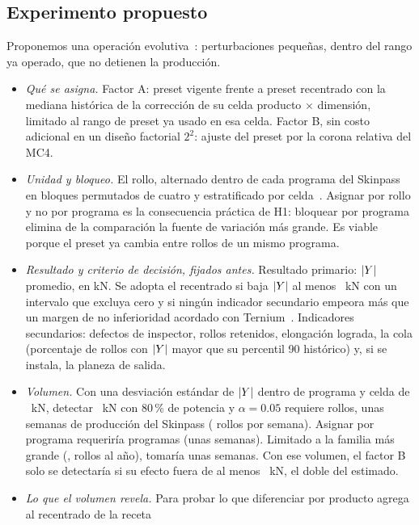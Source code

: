 \subsection{Experimento propuesto}
\label{sec:experimento}
Proponemos una operación evolutiva~\cite{box1957}: perturbaciones pequeñas, dentro del rango ya operado, que no
detienen la producción.
\begin{itemize}
\item \emph{Qué se asigna.} Factor A: preset vigente frente a preset recentrado con la mediana histórica de la
      corrección de su celda producto $\times$ dimensión, limitado al rango de preset ya usado en esa celda. Factor B,
      sin costo adicional en un diseño factorial $2^2$: ajuste del preset por la corona relativa del MC4.
\item \emph{Unidad y bloqueo.} El rollo, alternado dentro de cada programa del Skinpass en bloques permutados de cuatro
      y estratificado por celda~\cite{box2005,montgomery2017}. Asignar por rollo y no por programa es la consecuencia
      práctica de H1: bloquear por programa elimina de la comparación la fuente de variación más grande. Es viable porque
      el preset ya cambia entre rollos de un mismo programa.
\item \emph{Resultado y criterio de decisión, fijados antes.} Resultado primario: $|Y|$ promedio, en kN. Se adopta el
      recentrado si baja $|Y|$ al menos \ExpDeltaA~kN con un intervalo que excluya cero y si ningún indicador
      secundario empeora más que un margen de no inferioridad acordado con Ternium~\cite{wellek2010}. Indicadores
      secundarios: defectos de inspector, rollos retenidos, elongación lograda, la cola (porcentaje de rollos con $|Y|$
      mayor que su percentil 90 histórico) y, si se instala, la planeza de salida.
\item \emph{Volumen.} Con una desviación estándar de $|Y|$ dentro de programa y celda de \ExpTodoSigmaDentro~kN, detectar
      \ExpDeltaA~kN con 80\,\% de potencia y $\alpha=0.05$ requiere \ExpTodoARollos{} rollos, unas \ExpTodoASemRollo{}
      semanas de producción del Skinpass (\ExpTodoRollosSemana{} rollos por semana). Asignar por programa requeriría
      \ExpTodoAProg{} programas (unas \ExpTodoASemProg{} semanas). Limitado a la familia más grande
      (\ExpFamilia, \ExpFamiliaRollos{} rollos al año), tomaría unas \ExpFamASemRollo{} semanas. Con ese volumen, el
      factor B solo se detectaría si su efecto fuera de al menos \ExpMDEB~kN, el doble del estimado.
\item \emph{Lo que el volumen revela.} Para probar lo que diferenciar por producto agrega al recentrado de la receta

\end{itemize}
